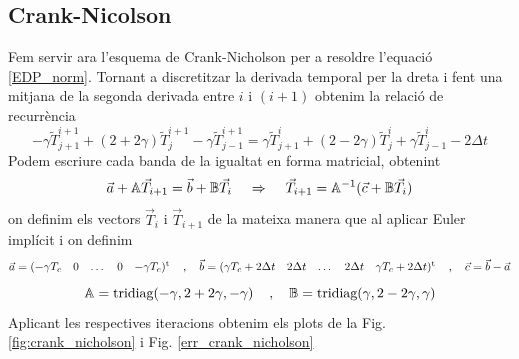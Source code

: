 \documentclass{article}
\begin{document}
\subsection{Crank-Nicolson}
Fem servir ara l'esquema de Crank-Nicholson per a resoldre l'equació \eqref{EDP_norm}. Tornant a discretitzar la derivada temporal per la dreta i fent una mitjana de la segonda derivada entre $i$ i $(i+1)$ obtenim la relació de recurrència
\begin{equation*}
    -\gamma\tilde{T}_{j+1}^{i+1} + (2+2\gamma)\tilde{T}_{j}^{i+1} - \gamma \tilde{T}_{j-1}^{i+1} = \gamma \tilde{T}_{j+1}^{i} + (2-2\gamma)\tilde{T}_{j}^{i} + \gamma \tilde{T}_{j-1}^{i} - 2\Delta t
\end{equation*}
Podem escriure cada banda de la igualtat en forma matricial, obtenint
\begin{equation*}
    \vec{a} + \mathbb{A} \vec{T}_{i+1} = \vec{b} + \mathbb{B}\vec{T}_{i} \hspace{4 mm} \Rightarrow \hspace{4 mm} \vec{T}_{i+1} = \mathbb{A}^{-1}(\vec{c}+\mathbb{B}\vec{T}_{i})
\end{equation*}
on definim els vectors $\vec{T}_{i}$ i $\vec{T}_{i+1}$ de la mateixa manera que al aplicar Euler implícit i on definim
\begin{equation*}
    \vec{a} = \begin{matrix} (-\gamma T_c & 0 & \dots & 0 & -\gamma T_c)^{\text{t}}\end{matrix} \hspace{4 mm} \text{,} \hspace{4 mm} \vec{b} = \begin{matrix} (\gamma T_c + 2\Delta t & 2\Delta t & \dots & 2\Delta t & \gamma T_c + 2\Delta t)^{\text{t}} \end{matrix} \hspace{4 mm} \text{,} \hspace{4 mm} \vec{c} = \vec{b} - \vec{a}
\end{equation*}
\begin{equation*}
    \mathbb{A} = \text{tridiag}(-\gamma,2+2\gamma,-\gamma) \hspace{4 mm} \text{,} \hspace{4 mm} \mathbb{B} = \text{tridiag}(\gamma,2-2\gamma,\gamma)
\end{equation*}
Aplicant les respectives iteracions obtenim els plots de la Fig. \ref{fig:crank_nicholson} i Fig. \ref{err_crank_nicholson}
\end{document}
